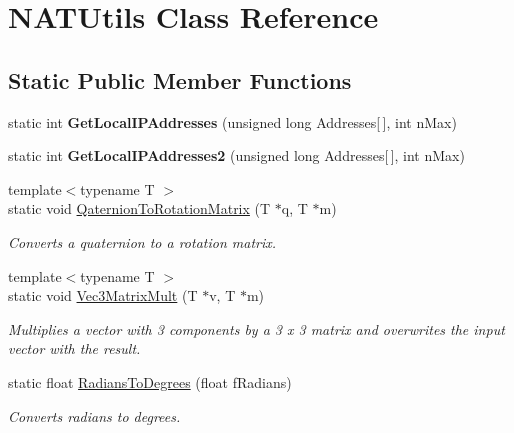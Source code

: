 \hypertarget{class_n_a_t_utils}{}\section{N\+A\+T\+Utils Class Reference}
\label{class_n_a_t_utils}
\subsection*{Static Public Member Functions}
\begin{DoxyCompactItemize}
\item 
static int {\bfseries Get\+Local\+I\+P\+Addresses} (unsigned long Addresses\mbox{[}$\,$\mbox{]}, int n\+Max)\hypertarget{class_n_a_t_utils_ae555d6ef00b1390a4a69ee677c8a97f1}{}\label{class_n_a_t_utils_ae555d6ef00b1390a4a69ee677c8a97f1}

\item 
static int {\bfseries Get\+Local\+I\+P\+Addresses2} (unsigned long Addresses\mbox{[}$\,$\mbox{]}, int n\+Max)\hypertarget{class_n_a_t_utils_aeaa1337aa84cffe493d53fdcd809eff7}{}\label{class_n_a_t_utils_aeaa1337aa84cffe493d53fdcd809eff7}

\item 
{\footnotesize template$<$typename T $>$ }\\static void \hyperlink{class_n_a_t_utils_a1786ab9e713ac59587dbe6050d8b91fc}{Qaternion\+To\+Rotation\+Matrix} (T $\ast$q, T $\ast$m)
\begin{DoxyCompactList}\small\item\em Converts a quaternion to a rotation matrix. \end{DoxyCompactList}\item 
{\footnotesize template$<$typename T $>$ }\\static void \hyperlink{class_n_a_t_utils_a825d3061e86f9ac7323935786e8d6c73}{Vec3\+Matrix\+Mult} (T $\ast$v, T $\ast$m)
\begin{DoxyCompactList}\small\item\em Multiplies a vector with 3 components by a 3 x 3 matrix and overwrites the input vector with the result. \end{DoxyCompactList}\item 
static float \hyperlink{class_n_a_t_utils_a2abf69f59abce23991c399d9775cec5a}{Radians\+To\+Degrees} (float f\+Radians)
\begin{DoxyCompactList}\small\item\em Converts radians to degrees. \end{DoxyCompactList}\end{DoxyCompactItemize}


